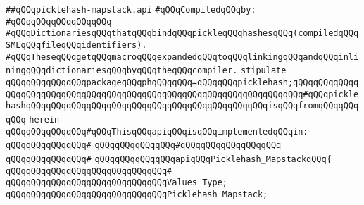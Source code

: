 \label{src/lib/compiler/front/basics/map/picklehash-mapstack.api}
\verb|##qQQqpicklehash-mapstack.api|\newline
\newline
\verb|#qQQqCompiledqQQqby:|\newline
\verb|#qQQqqQQqqQQqqQQqqQQq|\newline
\newline
\newline
\newline
\verb|#qQQqDictionariesqQQqthatqQQqbindqQQqpickleqQQqhashesqQQq(compiledqQQqSMLqQQqfileqQQqidentifiers).|\newline
\verb|#qQQqTheseqQQqgetqQQqmacroqQQqexpandedqQQqtoqQQqlinkingqQQqandqQQqinliningqQQqdictionariesqQQqbyqQQqtheqQQqcompiler.|\newline
\newline
\newline
\newline
\verb|stipulate|\newline
\verb|qQQqqQQqqQQqqQQqpackageqQQqphqQQqqQQq=qQQqqQQqpicklehash;qQQqqQQqqQQqqQQqqQQqqQQqqQQqqQQqqQQqqQQqqQQqqQQqqQQqqQQqqQQqqQQqqQQqqQQq#qQQqpicklehashqQQqqQQqqQQqqQQqqQQqqQQqqQQqqQQqqQQqqQQqqQQqqQQqisqQQqfromqQQqqQQqqQQq|\newline
\verb|herein|\newline
\newline
\verb|qQQqqQQqqQQqqQQq#qQQqThisqQQqapiqQQqisqQQqimplementedqQQqin:|\newline
\verb|qQQqqQQqqQQqqQQq#|\newline
\verb|qQQqqQQqqQQqqQQq#qQQqqQQqqQQqqQQqqQQq|\newline
\verb|qQQqqQQqqQQqqQQq#|\newline
\verb|qQQqqQQqqQQqqQQqapiqQQqPicklehash_MapstackqQQq{|\newline
\verb|qQQqqQQqqQQqqQQqqQQqqQQqqQQqqQQq#|\newline
\verb|qQQqqQQqqQQqqQQqqQQqqQQqqQQqqQQqValues_Type;|\newline
\newline
\verb|qQQqqQQqqQQqqQQqqQQqqQQqqQQqqQQqPicklehash_Mapstack;|\newline
\newline
